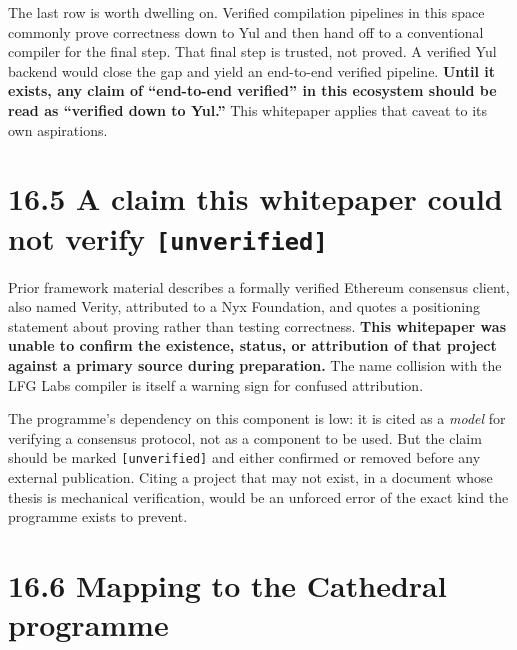 \documentclass[
  11pt]{report}
\begin{document}
The last row is worth dwelling on. Verified compilation pipelines in
this space commonly prove correctness down to Yul and then hand off to a
conventional compiler for the final step. That final step is trusted,
not proved. A verified Yul backend would close the gap and yield an
end-to-end verified pipeline. \textbf{Until it exists, any claim of
``end-to-end verified'' in this ecosystem should be read as ``verified
down to Yul.''} This whitepaper applies that caveat to its own
aspirations.

\hypertarget{a-claim-this-whitepaper-could-not-verify-unverified}{%
\section{\texorpdfstring{16.5 A claim this whitepaper could not verify
\texttt{{[}unverified{]}}}{16.5 A claim this whitepaper could not verify {[}unverified{]}}}\label{a-claim-this-whitepaper-could-not-verify-unverified}}

Prior framework material describes a formally verified Ethereum
consensus client, also named Verity, attributed to a Nyx Foundation, and
quotes a positioning statement about proving rather than testing
correctness. \textbf{This whitepaper was unable to confirm the
existence, status, or attribution of that project against a primary
source during preparation.} The name collision with the LFG Labs
compiler is itself a warning sign for confused attribution.

The programme's dependency on this component is low: it is cited as a
\emph{model} for verifying a consensus protocol, not as a component to
be used. But the claim should be marked \texttt{{[}unverified{]}} and
either confirmed or removed before any external publication. Citing a
project that may not exist, in a document whose thesis is mechanical
verification, would be an unforced error of the exact kind the programme
exists to prevent.

\hypertarget{mapping-to-the-cathedral-programme}{%
\section{16.6 Mapping to the Cathedral
programme}\label{mapping-to-the-cathedral-programme}}
\end{document}
